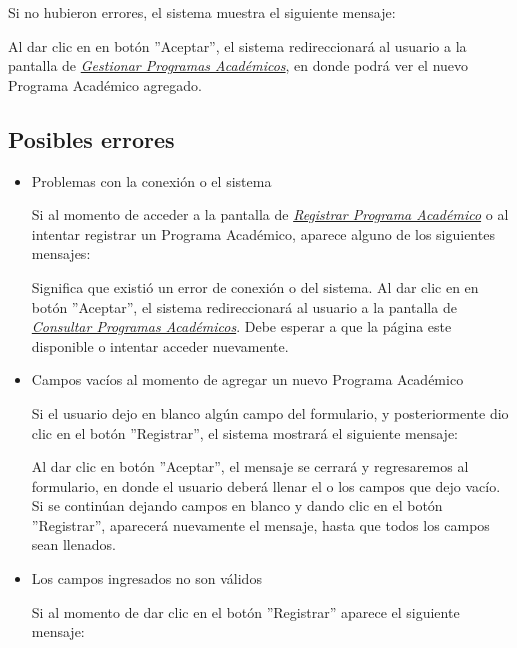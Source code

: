        Si no hubieron errores, el sistema muestra el siguiente mensaje:

        Al dar clic en en botón ''Aceptar'', el sistema redireccionará al usuario a la pantalla de \hyperlink{consultarpa}{\textit{Gestionar Programas Académicos}}, en donde podrá ver el nuevo Programa Académico agregado.\\

        \subsection{Posibles errores}
            \begin{itemize}

                \item Problemas con la conexión o el sistema

                    Si al momento de acceder a la pantalla de \hyperlink{registrarpa}{\textit{Registrar Programa Académico}} o al intentar registrar un Programa Académico, aparece alguno de los siguientes mensajes:

                    Significa que existió un error de conexión o del sistema. Al dar clic en en botón ''Aceptar'', el sistema redireccionará al usuario a la pantalla de \hyperlink{consultarpa}{\textit{Consultar Programas Académicos}}. Debe esperar a que la página este disponible o intentar acceder nuevamente.

                \item Campos vacíos al momento de agregar un nuevo Programa Académico

                    Si el usuario dejo en blanco algún campo del formulario, y posteriormente dio clic en el botón ''Registrar'', el sistema mostrará el siguiente mensaje:

                    Al dar clic en botón ''Aceptar'', el mensaje se cerrará y regresaremos al formulario, en donde el usuario deberá llenar el o los campos que dejo vacío. Si se continúan dejando campos en blanco y dando clic en el botón ''Registrar'', aparecerá nuevamente el mensaje, hasta que todos los campos sean llenados.\\


                \item Los campos ingresados no son válidos

                    Si al momento de dar clic en el botón ''Registrar'' aparece el siguiente mensaje:


\end{itemize}
